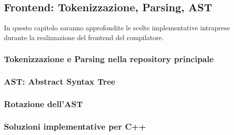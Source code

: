 \subsection{Frontend: Tokenizzazione, Parsing, AST}
In questo capitolo saranno approfondite le scelte implementative intraprese durante 
la realizzazione del frontend del compilatore.


\newpage

\subsubsection{Tokenizzazione e Parsing nella repository principale}
\subsubsection{AST: Abstract Syntax Tree}
\subsubsection{Rotazione dell'AST}
\subsubsection{Soluzioni implementative per C++}
